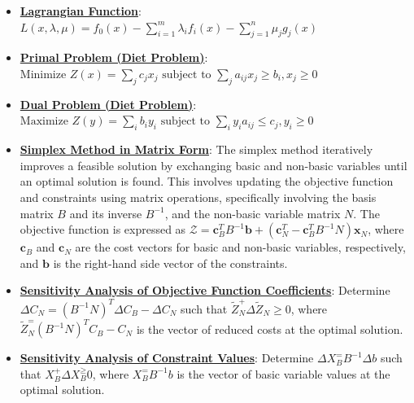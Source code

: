 \documentclass{article}%
\begin{document}
\begin{itemize}[leftmargin=*]%
\item \href{https://www.math.purdue.edu/~yipn/421//2024-09-17-DualityGeneral.pdf#page=7}{\textbf{Lagrangian Function}}: $L(x,\lambda,\mu) = f_0(x) - \sum_{i=1}^m \lambda_i f_i(x) - \sum_{j=1}^n \mu_j g_j(x)$%
\end{itemize}%
\begin{itemize}[leftmargin=*]%
\item \href{https://www.math.purdue.edu/~yipn/421//2024-09-19-DualityExamples.pdf#page=5}{\textbf{Primal Problem (Diet Problem)}}: $\text{Minimize } Z(x) = \sum_{j} c_j x_j \text{ subject to } \sum_{j} a_{ij} x_j \ge b_i, x_j \ge 0$%
\item \href{https://www.math.purdue.edu/~yipn/421//2024-09-19-DualityExamples.pdf#page=8}{\textbf{Dual Problem (Diet Problem)}}: $\text{Maximize } Z(y) = \sum_{i} b_i y_i \text{ subject to } \sum_{i} y_i a_{ij} \le c_j, y_i \ge 0$%
\end{itemize}%
\begin{itemize}[leftmargin=*]%
\item \href{https://www.math.purdue.edu/~yipn/421//2024-09-24-SimplexMatrix.pdf#page=8}{\textbf{Simplex Method in Matrix Form}}: The simplex method iteratively improves a feasible solution by exchanging basic and non-basic variables until an optimal solution is found.  This involves updating the objective function and constraints using matrix operations, specifically involving the basis matrix $B$ and its inverse $B^{-1}$, and the non-basic variable matrix $N$.  The objective function is expressed as $\mathcal{Z} = \mathbf{c}_B^T B^{-1} \mathbf{b} + (\mathbf{c}_N^T - \mathbf{c}_B^T B^{-1} N) \mathbf{x}_N$, where $\mathbf{c}_B$ and $\mathbf{c}_N$ are the cost vectors for basic and non-basic variables, respectively, and $\mathbf{b}$ is the right-hand side vector of the constraints.%
\end{itemize}%
\begin{itemize}[leftmargin=*]%
\item \href{https://www.math.purdue.edu/~yipn/421//2024-09-26-Sensitivity.pdf#page=7}{\textbf{Sensitivity Analysis of Objective Function Coefficients}}: Determine $\Delta C_N = (B^{-1}N)^T\Delta C_B - \Delta C_N$ such that $\tilde{Z}_N^ + \Delta \tilde{Z}_N \ge 0$, where $\tilde{Z}_N^ = (B^{-1}N)^TC_B - C_N$ is the vector of reduced costs at the optimal solution.%
\item \href{https://www.math.purdue.edu/~yipn/421//2024-09-26-Sensitivity.pdf#page=11}{\textbf{Sensitivity Analysis of Constraint Values}}: Determine $\Delta X_B^ = B^{-1}\Delta b$ such that $X_B^ + \Delta X_B^ \ge 0$, where $X_B^ = B^{-1}b$ is the vector of basic variable values at the optimal solution.%
\end{itemize}%
\end{document}
